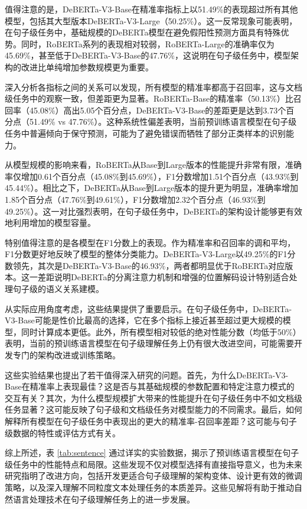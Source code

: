 值得注意的是，DeBERTa-V3-Base在精准率指标上以51.49\%的表现超过所有其他模型，包括其大型版本DeBERTa-V3-Large（50.25\%）。这一反常现象可能表明，在句子级任务中，基础规模的DeBERTa模型在避免假阳性预测方面具有特殊优势。同时，RoBERTa系列的表现相对较弱，RoBERTa-Large的准确率仅为45.69\%，甚至低于DeBERTa-V3-Base的47.76\%，这说明在句子级任务中，模型架构的改进比单纯增加参数规模更为重要。

深入分析各指标之间的关系可以发现，所有模型的精准率都高于召回率，这与文档级任务中的观察一致，但差距更为显著。RoBERTa-Base的精准率（50.13\%）比召回率（45.08\%）高出5.05个百分点，DeBERTa-V3-Base的差距更是达到3.73个百分点（51.49\% vs 47.76\%）。这种系统性偏差表明，当前预训练语言模型在句子级任务中普遍倾向于保守预测，可能为了避免错误而牺牲了部分正类样本的识别能力。

从模型规模的影响来看，RoBERTa从Base到Large版本的性能提升非常有限，准确率仅增加0.61个百分点（45.08\%到45.69\%），F1分数增加1.51个百分点（43.93\%到45.44\%）。相比之下，DeBERTa从Base到Large版本的提升更为明显，准确率增加1.85个百分点（47.76\%到49.61\%），F1分数增加2.32个百分点（46.93\%到49.25\%）。这一对比强烈表明，在句子级任务中，DeBERTa的架构设计能够更有效地利用增加的模型容量。

特别值得注意的是各模型在F1分数上的表现。作为精准率和召回率的调和平均，F1分数更好地反映了模型的整体分类能力。DeBERTa-V3-Large以49.25\%的F1分数领先，其次是DeBERTa-V3-Base的46.93\%，两者都明显优于RoBERTa对应版本。这一差距说明DeBERTa的分离注意力机制和增强的位置解码设计特别适合处理句子级的语义关系建模。

从实际应用角度考虑，这些结果提供了重要启示。在句子级任务中，DeBERTa-V3-Base可能是性价比最高的选择，它在多个指标上接近甚至超过更大规模的模型，同时计算成本更低。此外，所有模型相对较低的绝对性能分数（均低于50\%）表明，当前的预训练语言模型在句子级理解任务上仍有很大改进空间，可能需要开发专门的架构改进或训练策略。

这些实验结果也提出了若干值得深入研究的问题。首先，为什么DeBERTa-V3-Base在精准率上表现最佳？这是否与其基础规模的参数配置和特定注意力模式的交互有关？其次，为什么模型规模扩大带来的性能提升在句子级任务中不如文档级任务显著？这可能反映了句子级和文档级任务对模型能力的不同需求。最后，如何解释所有模型在句子级任务中表现出的更大的精准率-召回率差距？这可能与句子级数据的特性或评估方式有关。

综上所述，表 \ref{tab:sentence} 通过详实的实验数据，揭示了预训练语言模型在句子级任务中的性能特点和局限。这些发现不仅对模型选择有直接指导意义，也为未来研究指明了改进方向，包括开发更适合句子级理解的架构变体、设计更有效的微调策略，以及深入理解不同粒度文本处理任务的本质差异。这些见解将有助于推动自然语言处理技术在句子级理解任务上的进一步发展。

